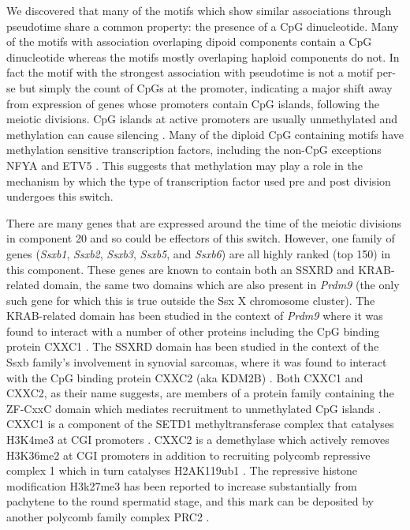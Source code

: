 We discovered that many of the motifs which show similar associations through pseudotime share a common property: the presence of a CpG dinucleotide.
Many of the motifs with association overlaping dipoid components contain a CpG dinucleotide whereas the motifs mostly overlaping haploid components do not.
In fact the motif with the strongest association with pseudotime is not a motif per-se but simply the count of CpGs at the promoter, indicating a major shift away from expression of genes whose promoters contain CpG islands, following the meiotic divisions.
CpG islands at active promoters are usually unmethylated and methylation can cause silencing \parencite{Li2014DNA}.
Many of the diploid CpG containing motifs have methylation sensitive transcription factors, including the non-CpG exceptions NFYA and ETV5 \parencite{Domcke2015Competition, Wang2017NRF1}.
This suggests that methylation may play a role in the mechanism by which the type of transcription factor used pre and post division undergoes this switch.

\label{sec:ssx}
There are many genes that are expressed around the time of the meiotic divisions in component 20 and so could be effectors of this switch.
However, one family of genes (\textit{Ssxb1}, \textit{Ssxb2}, \textit{Ssxb3}, \textit{Ssxb5}, and \textit{Ssxb6}) are all highly ranked (top 150) in this component.
These genes are known to contain both an SSXRD and KRAB-related domain, the same two domains which are also present in \textit{Prdm9} (the only such gene for which this is true outside the Ssx X chromosome cluster).
The KRAB-related domain has been studied in the context of \textit{Prdm9} where it was found to interact with a number of other proteins including the CpG binding protein CXXC1 \parencite{Imai2017PRDM9, Parvanov2017PRDM9}.
The SSXRD domain has been studied in the context of the Ssxb family's involvement in synovial sarcomas, where it was found to interact with the CpG binding protein CXXC2 (aka KDM2B) \parencite{Banito2018SS18SSX}.
Both CXXC1 and CXXC2, as their name suggests, are members of a protein family containing the ZF-CxxC domain which mediates recruitment to unmethylated CpG islands \parencite[reviewed in][]{Long2013ZFCxxC}.
CXXC1 is a component of the SETD1 methyltransferase complex that catalyses H3K4me3 at CGI promoters \parencite{Lee2005CpGbinding}.
CXXC2 is a demethylase which actively removes H3K36me2 at CGI promoters in addition to recruiting polycomb repressive complex 1 which in turn catalyses H2AK119ub1 \parencite{He2008H3K36, Farcas2012KDM2B, He2013Kdm2b, Wu2013Fbxl10}.
The repressive histone modification H3k27me3 has been reported to increase substantially from pachytene to the round spermatid stage, and this mark can be deposited by another polycomb family complex PRC2 \parencite{Sin2015Poised}.


